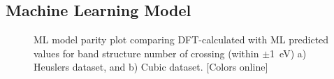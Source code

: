 \documentclass[article]{elsarticle}
\begin{document}
\subsection{Machine Learning Model}
\begin{figure}[H]
    \centering
        \quad
        
\caption{ML model parity plot comparing DFT-calculated with ML predicted values for band structure number of crossing (within $\pm$\SI{1}{\electronvolt}) a) Heuslers dataset, and b) Cubic dataset. [Colors online]}
\label{fig:MLmodel}
\end{figure}
\end{document}
